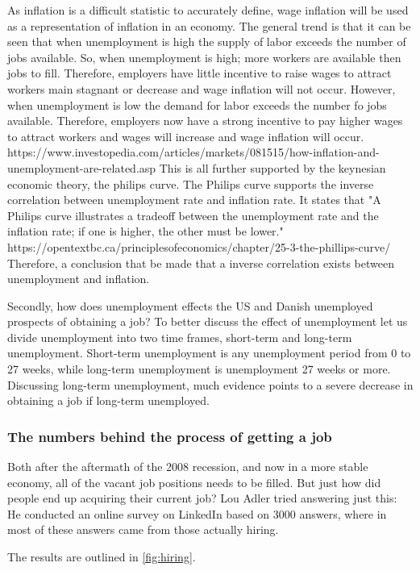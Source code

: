 As inflation is a difficult statistic to accurately define, wage inflation will be used as a representation of inflation in an economy.
The general trend is that it can be seen that when unemployment is high the supply of labor exceeds the number of jobs available.
So, when unemployment is high; more workers are available then jobs to fill.
Therefore, employers have little incentive to raise wages to attract workers main stagnant or decrease and wage inflation will not occur.
However, when unemployment is low the demand for labor exceeds the number fo jobs available. 
Therefore, employers now have a strong incentive to pay higher wages to attract workers and wages will increase and wage inflation will occur. https://www.investopedia.com/articles/markets/081515/how-inflation-and-unemployment-are-related.asp
This is all further supported by the keynesian economic theory, the philips curve.
The Philips curve supports the inverse correlation between unemployment rate and inflation rate.
It states that "A Philips curve illustrates a tradeoff between the unemployment rate and the inflation rate; if one is higher, the other must be lower." https://opentextbc.ca/principlesofeconomics/chapter/25-3-the-phillips-curve/
Therefore, a conclusion that be made that a inverse correlation exists between unemployment and inflation.

Secondly, how does unemployment effects the US and Danish unemployed prospects of obtaining a job?
To better discuss the effect of unemployment let us divide unemployment into two time frames, short-term and long-term unemployment.
Short-term unemployment is any unemployment period from 0 to 27 weeks, while long-term unemployment is unemployment 27 weeks or more.
Discussing long-term unemployment, much evidence points to a severe decrease in obtaining a job if long-term unemployed. 

\subsubsection{The numbers behind the process of getting a job}
Both after the aftermath of the 2008 recession, and now in a more stable
economy, all of the vacant job positions needs to be
filled. But just how did people end up acquiring their current job?
Lou Adler tried answering just this: He conducted an online survey
on LinkedIn based on 3000 answers, where in most of these answers
came from those actually hiring.

The results are outlined in \vref{fig:hiring}.

